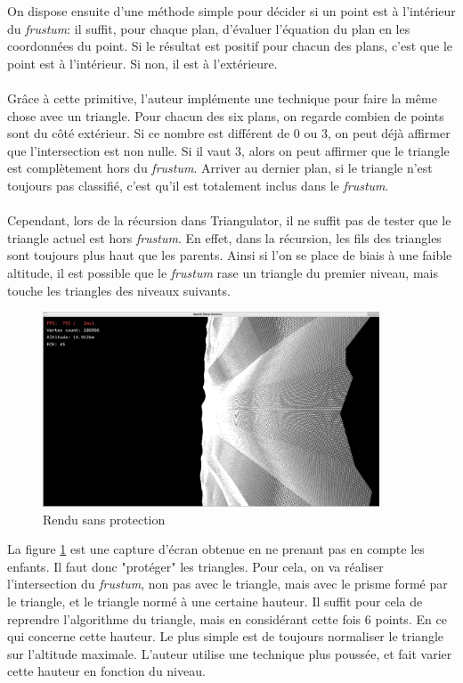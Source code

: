  On dispose ensuite d'une méthode simple pour décider si un point est à l'intérieur du \emph{frustum}: il suffit, pour chaque plan, d'évaluer l'équation du plan en les coordonnées du point. Si le résultat est positif pour chacun des plans, c'est que le point est à l'intérieur. Si non, il est à l'extérieure. 
  \paragraph{}
  Grâce à cette primitive, l'auteur implémente une technique pour faire la même chose avec un triangle. Pour chacun des six plans, on regarde combien de points sont du côté extérieur. Si ce nombre est différent de 0 ou 3, on peut déjà affirmer que l'intersection est non nulle. Si il vaut 3, alors on peut affirmer que le triangle est complètement hors du \emph{frustum}. Arriver au dernier plan, si le triangle n'est toujours pas classifié, c'est qu'il est totalement inclus dans le \emph{frustum}.
  
  \paragraph{}
  Cependant, lors de la récursion dans Triangulator, il ne suffit pas de tester que le triangle actuel est hors \emph{frustum}. En effet, dans la récursion, les fils des triangles sont toujours plus haut que les parents. Ainsi si l'on se place de biais à une faible altitude, il est possible que le \emph{frustum} rase un triangle du premier niveau, mais touche les triangles des niveaux suivants. 
  \begin{figure}[H]
  \centerline{
  \includegraphics[width=10cm]{img/noCullingProtection.png}}
  \caption{Rendu sans protection}
  \label{fig:noProtectionCulling}
  \end{figure}
  La figure \ref{fig:noProtectionCulling} est une capture d'écran obtenue en ne prenant pas en compte les enfants. Il faut donc "protéger" les triangles. Pour cela, on va réaliser l'intersection du \emph{frustum}, non pas avec le triangle, mais avec le prisme formé par le triangle, et le triangle normé à une certaine hauteur. Il suffit pour cela de reprendre l'algorithme du triangle, mais en considérant cette fois 6 points.
  En ce qui concerne cette hauteur. Le plus simple est de toujours normaliser le triangle sur l'altitude maximale. L'auteur utilise une technique plus poussée, et fait varier cette hauteur en fonction du niveau.  
  
